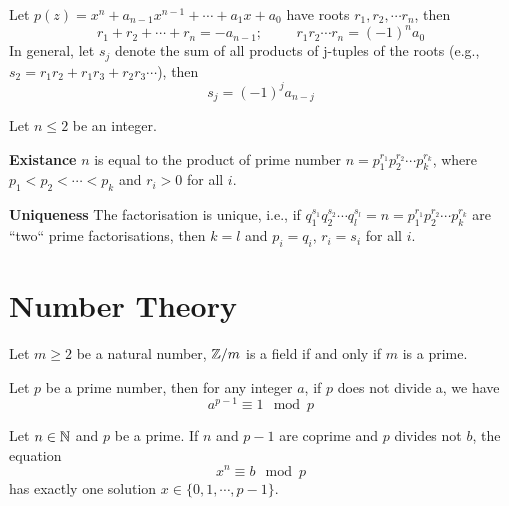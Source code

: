 \documentclass[12pt]{article}
\begin{document}
\begin{theorem}
	Let $p(z) = x^n+a_{n-1}x^{n-1} + \cdots + a_1x+a_0$ have roots $r_1, r_2, \cdots r_n$, then
	\begin{equation}
		r_1+r_2+\cdots+r_n=-a_{n-1};\hspace{1cm} r_1r_2\cdots r_n=(-1)^na_0
	\end{equation}
	In general, let $s_j$ denote the sum of all products of j-tuples of the roots (e.g., $s_2 = r_1r_2+r_1r_3+r_2r_3 \cdots$), then 
	\begin{equation}
		s_j = (-1)^ja_{n-j}
	\end{equation}
\end{theorem}
\begin{theorem}
	Let $n\leq 2$ be an integer.

	\textbf{Existance} $n$ is equal to the product of prime number $n=p_1^{r_1}p_2^{r_2}\cdots p_k^{r_k} $, where $p_1<p_2<\cdots<p_k$ and $r_i>0$ for all $i$.

	\textbf{Uniqueness} The factorisation is unique, i.e., if $q_1^{s_1}q_2^{s_2}\cdots q_l^{s_l}=n=p_1^{r_1}p_2^{r_2}\cdots p_k^{r_k} $ are ``two`` prime factorisations, then $k=l$ and $p_i=q_i$, $r_i=s_i$ for all $i$.
\end{theorem}

\section{Number Theory}

\begin{theorem}
	Let $m\geq 2$ be a natural number, $\mathbb{Z}/m$ is a field if and only if $m$ is a prime.
\end{theorem}
\begin{theorem}
	Let $p$ be a prime number, then for any integer $a$, if $p$ does not divide a, we have
	\begin{equation}
		a^{p-1}\equiv 1 \mod p
	\end{equation}
\end{theorem}

\begin{theorem}
Let $n\in \mathbb{N}$ and $p$ be a prime. If $n$ and $p-1$ are coprime and $p$ divides not $b$, the equation 
\begin{equation}
	x^n\equiv b \mod p
\end{equation}
has exactly one solution $x\in \{0, 1, \cdots, p-1\}$.
\end{theorem}
\end{document}
